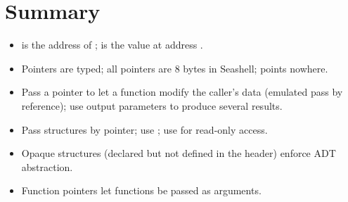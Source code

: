 \section{Summary}
\begin{itemize}
  \item {} is the address of ;  is the value at address .
  \item Pointers are typed; all pointers are 8 bytes in Seashell;  points nowhere.
  \item Pass a pointer to let a function modify the caller's data (emulated pass by reference);
    use output parameters to produce several results.
  \item Pass structures by pointer; use \code{->}; use  for read-only access.
  \item Opaque structures (declared but not defined in the header) enforce ADT abstraction.
  \item Function pointers let functions be passed as arguments.
\end{itemize}

